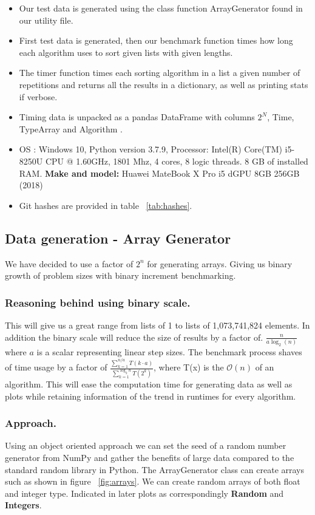 \documentclass[sigconf, nonacm, natbib, screen, balance=False]{acmart}
\begin{document}
\begin{itemize}
\item Our test data is generated using the class function ArrayGenerator found in our utility file.
\item First test data is generated, then our benchmark function times how long each algorithm uses to sort given lists with given lengths.  
\item The timer function times each sorting algorithm in a list a given number of repetitions and returns all the results in a dictionary, as well as printing stats if verbose.
\item Timing data is unpacked as a pandas DataFrame with columns $2^N$, Time, TypeArray and Algorithm . 
\item OS : Windows 10, Python version 3.7.9, 
Processor:	Intel(R) Core(TM) i5-8250U CPU @ 1.60GHz, 1801 Mhz, 4 cores, 8 logic threads.
8 GB of installed RAM. 
\textbf{Make and model:} Huawei MateBook X Pro i5 dGPU 8GB 256GB (2018)

\item Git hashes are provided in table ~\ref{tab:hashes}.
\end{itemize}

\subsection{Data generation - Array Generator}\label{sec:methdata}
We have decided to use a factor of $2^n$ for generating arrays. Giving us binary growth of problem sizes with binary increment benchmarking. 

\subsubsection{Reasoning behind using binary scale.}\label{sec:datareason} This will give us a great range from lists of 1 to lists of 1,073,741,824 elements. In addition the binary scale will reduce the size of results by a factor of. $\frac{n}{a \log_2(n)}$ where $a$ is a scalar representing linear step sizes. The benchmark process shaves of time usage by a factor of $\frac{\sum_{k=1}^{n/a}T\left(k\cdot a \right)}{\sum_{k=1}^{\log_{2}n}T \left(2^{k}\right)}$, where T(x) is the $\mathcal{O}(n)$ of an algorithm. This will ease the computation time for generating data as well as plots while retaining information of the trend in runtimes for every algorithm. 

\subsubsection{Approach.}\label{sec:dataapproach}Using an object oriented approach we can set the seed of a random number generator from NumPy and gather the benefits of large data compared to the standard random library in Python. 
The ArrayGenerator class can create arrays such as shown in figure ~\ref{fig:arrays}. We can create random arrays of both float and integer type. Indicated in later plots as correspondingly \textbf{Random} and \textbf{Integers}. 
\end{document}
